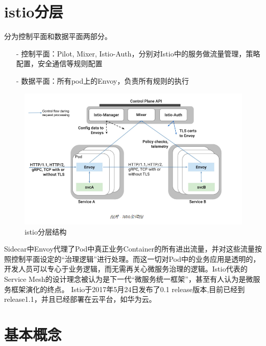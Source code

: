 \documentclass{ctexart}
\begin{document}
\section{istio分层}
分为控制平面和数据平面两部分。 
\begin{enumerate}
	\item [-] 控制平面：Pilot, Mixer, Istio-Auth，分别对Istio中的服务做流量管理，策略配置，安全通信等规则配置 
	\item [-] 数据平面：所有pod上的Envoy，负责所有规则的执行
\end{enumerate}
\begin{figure}[H]
\includegraphics[scale=0.5]{istio/framework2.png}
\caption{istio分层结构}
\end{figure}
Sidecar中Envoy代理了Pod中真正业务Container的所有进出流量，并对这些流量按照控制平面设定的“治理逻辑”进行处理。而这一切对Pod中的业务应用是透明的，开发人员可以专心于业务逻辑，而无需再关心微服务治理的逻辑。Istio代表的Service Mesh的设计理念被认为是下一代“微服务统一框架”，甚至有人认为是微服务框架演化的终点。
Istio于2017年5月24日发布了0.1 release版本,目前已经到release1.1，并且已经部署在云平台，如华为云。

\section{基本概念}
\end{document}
